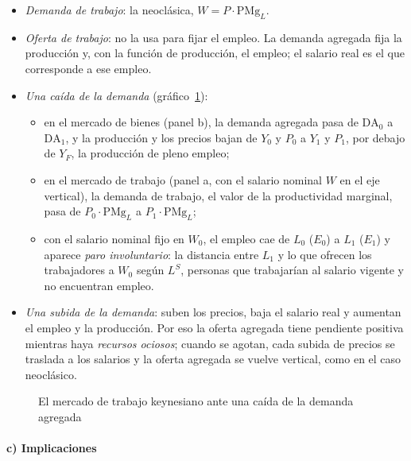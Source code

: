 \documentclass[11pt]{article}
\begin{document}
\begin{itemize}
\item \emph{Demanda de trabajo}: la neoclásica, $W=P\cdot\mathrm{PMg}_L$.
\item \emph{Oferta de trabajo}:  no la usa para fijar el empleo. La demanda agregada fija la producción y, con la función de producción, el empleo; el salario real es el que corresponde a ese empleo.
\item \emph{Una caída de la demanda} (gráfico~\ref{fig:keynesiano-shock}):
  \begin{itemize}
  \item en el mercado de bienes (panel b), la demanda agregada pasa de $\mathrm{DA}_0$ a $\mathrm{DA}_1$, y la producción y los precios bajan de $Y_0$ y $P_0$ a $Y_1$ y $P_1$, por debajo de $Y_F$, la producción de pleno empleo;
  \item en el mercado de trabajo (panel a, con el salario nominal $W$ en el eje vertical), la demanda de trabajo, el valor de la productividad marginal, pasa de $P_0\cdot\mathrm{PMg}_L$ a $P_1\cdot\mathrm{PMg}_L$;
  \item con el salario nominal fijo en $W_0$, el empleo cae de $L_0$ ($E_0$) a $L_1$ ($E_1$) y aparece \emph{paro involuntario}: la distancia entre $L_1$ y lo que ofrecen los trabajadores a $W_0$ según $L^S$, personas que trabajarían al salario vigente y no encuentran empleo.
  \end{itemize}
\item \emph{Una subida de la demanda}: suben los precios, baja el salario real y aumentan el empleo y la producción. Por eso la oferta agregada tiene pendiente positiva mientras haya \emph{recursos ociosos}; cuando se agotan, cada subida de precios se traslada a los salarios y la oferta agregada se vuelve vertical, como en el caso neoclásico.
\end{itemize}

\begin{figure}[H]
\centering
\caption{El mercado de trabajo keynesiano ante una caída de la demanda agregada}\label{fig:keynesiano-shock}
\end{figure}

\paragraph{c) Implicaciones}
\end{document}
